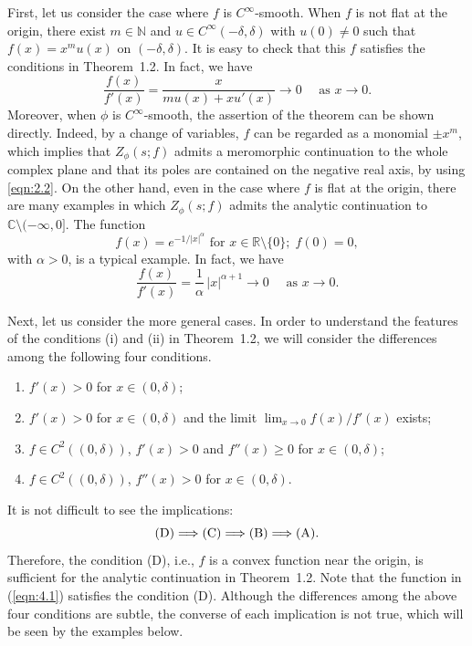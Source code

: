 \documentclass[12pt]{amsart}
\numberwithin{equation}{section}
\theoremstyle{definition}
\theoremstyle{remark}
\newcommand{\R}{{\mathbb R}}
\newcommand{\C}{{\mathbb C}}
\newcommand{\N}{{\mathbb N}}
\newcommand{\1}{{\bf 1}}
\begin{document}
First, let us consider the case where 
$f$ is $C^{\infty}$-smooth. 
When
$f$ is not flat at the origin, 
there exist $m\in\N$ and 
$u\in C^{\infty}(-\delta,\delta)$
with $u(0)\neq 0$ such that $f(x)=x^m u(x)$ on 
$(-\delta, \delta)$. 
It is easy to check that this $f$ 
satisfies the conditions in Theorem~1.2.
In fact, we have 
\begin{equation*}
\frac{f(x)}{f'(x)}=
\frac{x}{m u(x)+x u'(x)} \longrightarrow 0 
\quad \text{ as } x\to 0.
\end{equation*}
Moreover, when $\phi$ is $C^{\infty}$-smooth, 
the assertion of the theorem can be shown directly.
Indeed, by a change of variables, 
$f$ can be regarded as a monomial 
$\pm x^m$, which implies that 
$Z_{\phi}(s;f)$ 
admits a meromorphic continuation 
to the whole complex plane and 
that its poles are contained 
on the negative real axis, 
by using \eqref{eqn:2.2}.
On the other hand, 
even in the case where $f$ is flat at the origin, 
there are many examples in which 
$Z_{\phi}(s;f)$ admits the analytic continuation 
to $\C\setminus(-\infty,0]$. 
The function
\begin{equation}\label{eqn:4.1}
f(x)= e^{-1/|x|^{\alpha}} \text{ for }
x\in\R\setminus\{0\}; \; f(0)=0,
\end{equation}
with $\alpha>0$, 
is a typical example. 
In fact, 
we have 
\begin{equation*}
\frac{f(x)}{f'(x)}=
\frac{1}{\alpha}\, |x|^{\alpha+1} \longrightarrow 0 
\quad \text{ as } x\to 0.
\end{equation*}

Next, 
let us consider the more general cases. 
In order to understand the features 
of the conditions (i) and (ii) in Theorem~1.2, 
we will consider the differences 
among the following four conditions.
\begin{enumerate}
\item[(A)] 
$f'(x)>0$ for $x\in(0,\delta)$;
\item[(B)] 
$f'(x)>0$ for $x\in(0,\delta)$ and the limit 
$\lim_{x\to 0} f(x)/f'(x)$ exists; 
\item[(C)] 
$f\in C^2((0,\delta))$, 
$f'(x)>0$ and $f''(x)\geq 0$ for $x\in(0,\delta)$;
\item[(D)]  
$f\in C^2((0,\delta))$, 
$f''(x)>0$ for $x\in(0,\delta)$.
\end{enumerate}
It is not difficult to see the implications:
\begin{equation*}
{\rm (D)} \Longrightarrow 
{\rm (C)} \Longrightarrow 
{\rm (B)} \Longrightarrow 
{\rm (A)}.
\end{equation*}
Therefore, 
the condition (D), i.e., $f$ is a convex function near the origin, 
is sufficient for the analytic continuation in Theorem~1.2.
Note that 
the function in (\ref{eqn:4.1}) satisfies the condition (D).
Although the differences 
among the above four conditions are subtle, 
the converse of each implication is not true, 
which will be seen by the examples below. 
\end{document}
